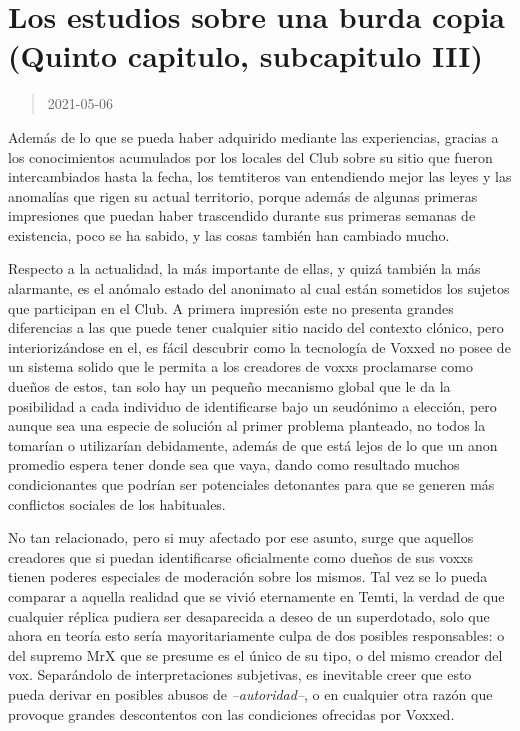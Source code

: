 \documentclass[
  spanish,
]{book}
\begin{document}
\hypertarget{los-estudios-sobre-una-burda-copia-quinto-capitulo-subcapitulo-iii}{%
\section{Los estudios sobre una burda copia (Quinto capitulo, subcapitulo III)}\label{los-estudios-sobre-una-burda-copia-quinto-capitulo-subcapitulo-iii}}

\begin{quote}
2021-05-06
\end{quote}

Además de lo que se pueda haber adquirido mediante las experiencias, gracias a los conocimientos acumulados por los locales del Club sobre su sitio que fueron intercambiados hasta la fecha, los temtiteros van entendiendo mejor las leyes y las anomalías que rigen su actual territorio, porque además de algunas primeras impresiones que puedan haber trascendido durante sus primeras semanas de existencia, poco se ha sabido, y las cosas también han cambiado mucho.

Respecto a la actualidad, la más importante de ellas, y quizá también la más alarmante, es el anómalo estado del anonimato al cual están sometidos los sujetos que participan en el Club. A primera impresión este no presenta grandes diferencias a las que puede tener cualquier sitio nacido del contexto clónico, pero interiorizándose en el, es fácil descubrir como la tecnología de Voxxed no posee de un sistema solido que le permita a los creadores de voxxs proclamarse como dueños de estos, tan solo hay un pequeño mecanismo global que le da la posibilidad a cada individuo de identificarse bajo un seudónimo a elección, pero aunque sea una especie de solución al primer problema planteado, no todos la tomarían o utilizarían debidamente, además de que está lejos de lo que un anon promedio espera tener donde sea que vaya, dando como resultado muchos condicionantes que podrían ser potenciales detonantes para que se generen más conflictos sociales de los habituales.

No tan relacionado, pero si muy afectado por ese asunto, surge que aquellos creadores que si puedan identificarse oficialmente como dueños de sus voxxs tienen poderes especiales de moderación sobre los mismos. Tal vez se lo pueda comparar a aquella realidad que se vivió eternamente en Temti, la verdad de que cualquier réplica pudiera ser desaparecida a deseo de un superdotado, solo que ahora en teoría esto sería mayoritariamente culpa de dos posibles responsables: o del supremo MrX que se presume es el único de su tipo, o del mismo creador del vox. Separándolo de interpretaciones subjetivas, es inevitable creer que esto pueda derivar en posibles abusos de \emph{--autoridad--}, o en cualquier otra razón que provoque grandes descontentos con las condiciones ofrecidas por Voxxed.
\end{document}
